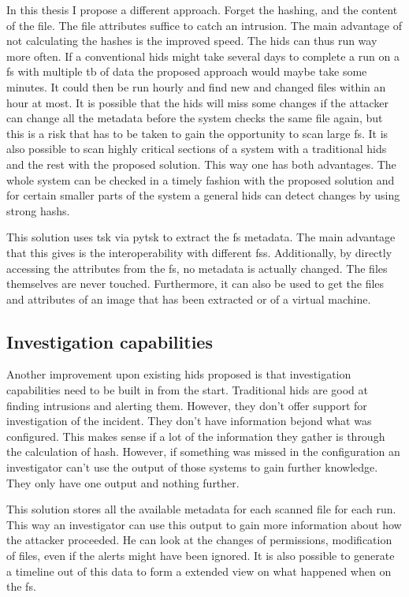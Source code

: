 \documentclass[
	a4paper,					%
	10pt,							%
	twoside,					%
	openright,				%
	notitlepage,			%
	parskip=half,			%
]{scrreprt}					%
\begin{document}
In this thesis I propose a different approach. Forget the hashing, and the content of the file. The file attributes suffice to catch an intrusion. The main advantage of not calculating the hashes is the improved speed. The \gls{hids} can thus run way more often. If a conventional \gls{hids} might take several days to complete a run on a \gls{fs} with multiple \gls{tb} of data the proposed approach would maybe take some minutes. It could then be run hourly and find new and changed files within an hour at most. It is possible that the \gls{hids} will miss some changes if the attacker can change all the \gls{metadata} before the system checks the same file again, but this is a risk that has to be taken to gain the opportunity to scan large \gls{fs}. It is also possible to scan highly critical sections of a system with a traditional \gls{hids} and the rest with the proposed solution. This way one has both advantages. The whole system can be checked in a timely fashion with the proposed solution and for certain smaller parts of the system a general \gls{hids} can detect changes by using strong \glspl{hash}.

This solution uses \gls{tsk} via \gls{pytsk} to extract the \gls{fs} \gls{metadata}. The main advantage that this gives is the interoperability with different \glspl{fs}. Additionally, by directly accessing the attributes from the \gls{fs}, no \gls{metadata} is actually changed. The files themselves are never touched. Furthermore, it can also be used to get the files and attributes of an image that has been extracted or of a virtual machine. 

\subsection{Investigation capabilities}
\label{sec:investigation:capabilities}
Another improvement upon existing \gls{hids} proposed is that investigation capabilities need to be built in from the start. Traditional \gls{hids} are good at finding intrusions and alerting them. However, they don't offer support for investigation of the incident. They don't have information bejond what was configured. This makes sense if a lot of the information they gather is through the calculation of \gls{hash}. However, if something was missed in the configuration an investigator can't use the output of those systems to gain further knowledge. They only have one output and nothing further.

This solution stores all the available \gls{metadata} for each scanned file for each run. This way an investigator can use this output to gain more information about how the attacker proceeded. He can look at the changes of permissions, modification of files, even if the alerts might have been ignored. It is also possible to generate a timeline out of this data to form a extended view on what happened when on the \gls{fs}. 
\end{document}

